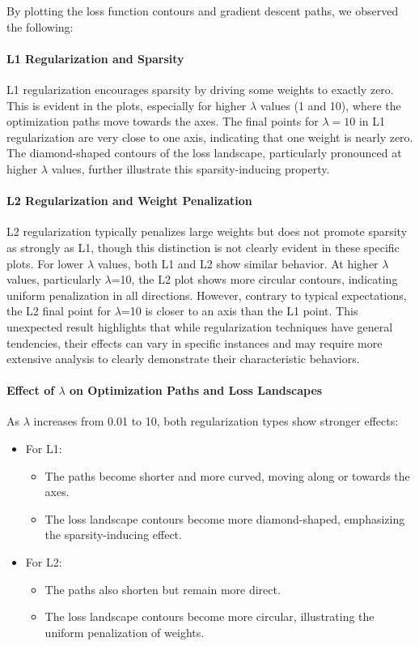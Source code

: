 \documentclass{article}
\begin{document}
By plotting the loss function contours and gradient descent paths, we observed the following:

\paragraph{L1 Regularization and Sparsity}
L1 regularization encourages sparsity by driving some weights to exactly zero. This is evident in the plots, especially for higher $\lambda$ values (1 and 10), where the optimization paths move towards the axes. The final points for $\lambda = 10$ in L1 regularization are very close to one axis, indicating that one weight is nearly zero. The diamond-shaped contours of the loss landscape, particularly pronounced at higher $\lambda$ values, further illustrate this sparsity-inducing property.

\paragraph{L2 Regularization and Weight Penalization}
L2 regularization typically penalizes large weights but does not promote sparsity as strongly as L1, though this distinction is not clearly evident in these specific plots. For lower $\lambda$ values, both L1 and L2 show similar behavior. At higher $\lambda$ values, particularly $\lambda$=10, the L2 plot shows more circular contours, indicating uniform penalization in all directions. However, contrary to typical expectations, the L2 final point for $\lambda$=10 is closer to an axis than the L1 point. This unexpected result highlights that while regularization techniques have general tendencies, their effects can vary in specific instances and may require more extensive analysis to clearly demonstrate their characteristic behaviors.

\paragraph{Effect of $\lambda$ on Optimization Paths and Loss Landscapes}
As $\lambda$ increases from 0.01 to 10, both regularization types show stronger effects:

\begin{itemize}
    \item For L1:
    \begin{itemize}
        \item The paths become shorter and more curved, moving along or towards the axes.
        \item The loss landscape contours become more diamond-shaped, emphasizing the sparsity-inducing effect.
    \end{itemize}
    \item For L2:
    \begin{itemize}
        \item The paths also shorten but remain more direct.
        \item The loss landscape contours become more circular, illustrating the uniform penalization of weights.
    \end{itemize}
\end{itemize}
\end{document}
